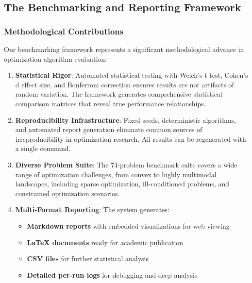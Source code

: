 \hypertarget{the-benchmarking-and-reporting-framework}{%
\subsection{The Benchmarking and Reporting Framework}\label{the-benchmarking-and-reporting-framework}}

\hypertarget{methodological-contributions}{%
\subsubsection{Methodological Contributions}\label{methodological-contributions}}

Our benchmarking framework represents a significant methodological advance in optimization algorithm evaluation:

\begin{enumerate}
\def\labelenumi{\arabic{enumi}.}
\item
  \textbf{Statistical Rigor}: Automated statistical testing with Welch's t-test, Cohen's d effect size, and Bonferroni correction ensures results are not artifacts of random variation. The framework generates comprehensive statistical comparison matrices that reveal true performance relationships.
\item
  \textbf{Reproducibility Infrastructure}: Fixed seeds, deterministic algorithms, and automated report generation eliminate common sources of irreproducibility in optimization research. All results can be regenerated with a single command.
\item
  \textbf{Diverse Problem Suite}: The 74-problem benchmark suite covers a wide range of optimization challenges, from convex to highly multimodal landscapes, including sparse optimization, ill-conditioned problems, and constrained optimization scenarios.
\item
  \textbf{Multi-Format Reporting}: The system generates:

  \begin{itemize}
  \tightlist
  \item
    \textbf{Markdown reports} with embedded visualizations for web viewing
  \item
    \textbf{LaTeX documents} ready for academic publication
  \item
    \textbf{CSV files} for further statistical analysis
  \item
    \textbf{Detailed per-run logs} for debugging and deep analysis
  \end{itemize}
\end{enumerate}

